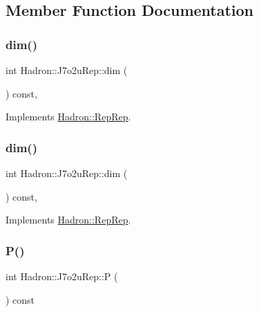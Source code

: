 \subsection{Member Function Documentation}
\mbox{\label{structHadron_1_1J7o2uRep_a3e4b64082feea60a18a0f73a6a8a17b2}} 
\subsubsection{\texorpdfstring{dim()}{dim()}\hspace{0.1cm}{\footnotesize\ttfamily [1/2]}}
{\footnotesize\ttfamily int Hadron\+::\+J7o2u\+Rep\+::dim (\begin{DoxyParamCaption}{ }\end{DoxyParamCaption}) const\hspace{0.3cm}{\ttfamily [inline]}, {\ttfamily [virtual]}}



Implements \mbox{\hyperlink{structHadron_1_1RepRep_a92c8802e5ed7afd7da43ccfd5b7cd92b}{Hadron\+::\+Rep\+Rep}}.

\mbox{\label{structHadron_1_1J7o2uRep_a3e4b64082feea60a18a0f73a6a8a17b2}} 
\subsubsection{\texorpdfstring{dim()}{dim()}\hspace{0.1cm}{\footnotesize\ttfamily [2/2]}}
{\footnotesize\ttfamily int Hadron\+::\+J7o2u\+Rep\+::dim (\begin{DoxyParamCaption}{ }\end{DoxyParamCaption}) const\hspace{0.3cm}{\ttfamily [inline]}, {\ttfamily [virtual]}}



Implements \mbox{\hyperlink{structHadron_1_1RepRep_a92c8802e5ed7afd7da43ccfd5b7cd92b}{Hadron\+::\+Rep\+Rep}}.

\mbox{\label{structHadron_1_1J7o2uRep_a88b8aa1e3c89050f1f0a901f0082b927}} 
\subsubsection{\texorpdfstring{P()}{P()}\hspace{0.1cm}{\footnotesize\ttfamily [1/2]}}
{\footnotesize\ttfamily int Hadron\+::\+J7o2u\+Rep\+::P (\begin{DoxyParamCaption}{ }\end{DoxyParamCaption}) const\hspace{0.3cm}{\ttfamily [inline]}}

